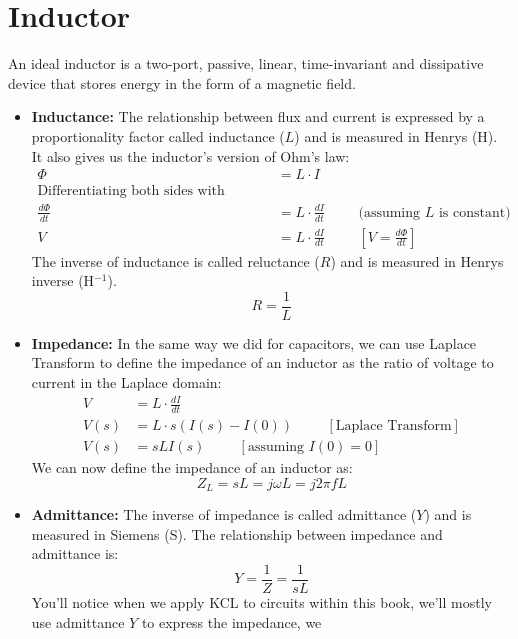 \section{Inductor}
An ideal inductor is a two-port, passive, linear, time-invariant
and dissipative device that stores energy in the form of a
magnetic field.

\begin{itemize}
  \item \textbf{Inductance:}
    The relationship between flux and current is
    expressed by a proportionality factor called inductance (\(L\))
    and is measured in Henrys (H). It also gives us the inductor's
    version of Ohm's law:
    \begin{align*}
      \Phi &= L \cdot I \\
      \text{Differentiating both sides with respect to time:} \\
      \frac{d\Phi}{dt} &= L \cdot \frac{dI}{dt} \hspace{1cm} \text{(assuming \(L\) is constant)} \\
      V &= L \cdot \frac{dI}{dt} \hspace{1cm} [V = \frac{d\Phi}{dt}]
    \end{align*}
    The inverse of inductance is called reluctance (\(R\)) and is
    measured in Henrys inverse (H\(^{-1}\)).
    \[
      R = \frac{1}{L}
    \]
  \item \textbf{Impedance:}
    In the same way we did for capacitors, we can use Laplace
    Transform to  define the impedance of an inductor as the ratio
    of voltage to current in the Laplace domain:
    \begin{align*}
      V &= L \cdot \frac{dI}{dt} \\
      V(s) &= L \cdot s (I(s) - I(0)) \hspace{1cm} [\text{Laplace Transform}] \\
      V(s) &= s L I(s) \hspace{1cm} [\text{assuming \(I(0) = 0\)}]
    \end{align*}
    We can now define the impedance of an inductor as:
    \[
      Z_L = s L = j\omega L = j 2 \pi f L
    \]
  \item \textbf{Admittance:}
    The inverse of impedance is called admittance (\(Y\)) and is
    measured in Siemens (S). The relationship between impedance
    and admittance is:
    \[
      Y = \frac{1}{Z} = \frac{1}{sL}
    \]
    You'll notice when we apply KCL to circuits within this book,
    we'll mostly use admittance \(Y\) to express the impedance, we

\end{itemize}
